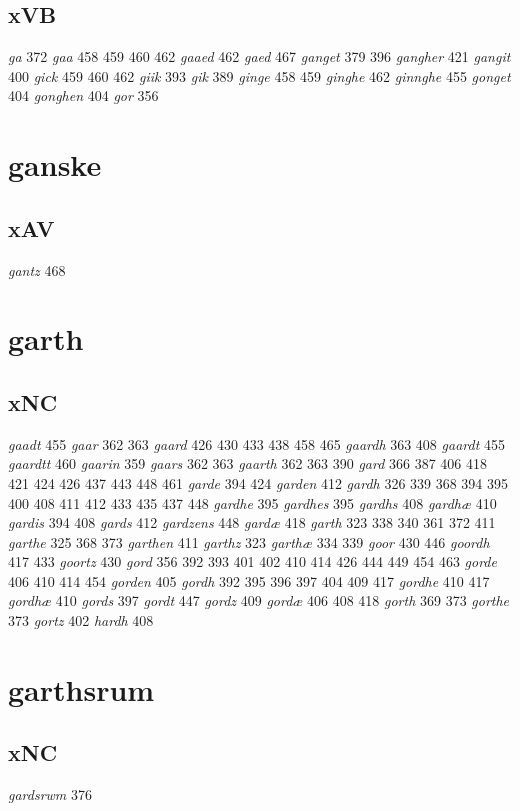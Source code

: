 \documentclass[a4paper,twocolumn]{article}
\begin{document}
\subsection{xVB}
\label{sec:orgdc026fc}
\emph{ga} 372 \emph{gaa} 458 459 460 462 \emph{gaaed} 462 \emph{gaed} 467 \emph{ganget} 379 396 \emph{gangher} 421 \emph{gangit} 400 \emph{gick} 459 460 462 \emph{giik} 393 \emph{gik} 389 \emph{ginge} 458 459 \emph{ginghe} 462 \emph{ginnghe} 455 \emph{gonget} 404 \emph{gonghen} 404 \emph{gor} 356 
\section{ganske}
\label{sec:org8220e9e}
\subsection{xAV}
\label{sec:orge936c39}
\emph{gantz} 468 
\section{garth}
\label{sec:orgb8a8e87}
\subsection{xNC}
\label{sec:org0e040cd}
\emph{gaadt} 455 \emph{gaar} 362 363 \emph{gaard} 426 430 433 438 458 465 \emph{gaardh} 363 408 \emph{gaardt} 455 \emph{gaardtt} 460 \emph{gaarin} 359 \emph{gaars} 362 363 \emph{gaarth} 362 363 390 \emph{gard} 366 387 406 418 421 424 426 437 443 448 461 \emph{garde} 394 424 \emph{garden} 412 \emph{gardh} 326 339 368 394 395 400 408 411 412 433 435 437 448 \emph{gardhe} 395 \emph{gardhes} 395 \emph{gardhs} 408 \emph{gardhæ} 410 \emph{gardis} 394 408 \emph{gards} 412 \emph{gardzens} 448 \emph{gardæ} 418 \emph{garth} 323 338 340 361 372 411 \emph{garthe} 325 368 373 \emph{garthen} 411 \emph{garthz} 323 \emph{garthæ} 334 339 \emph{goor} 430 446 \emph{goordh} 417 433 \emph{goortz} 430 \emph{gord} 356 392 393 401 402 410 414 426 444 449 454 463 \emph{gorde} 406 410 414 454 \emph{gorden} 405 \emph{gordh} 392 395 396 397 404 409 417 \emph{gordhe} 410 417 \emph{gordhæ} 410 \emph{gords} 397 \emph{gordt} 447 \emph{gordz} 409 \emph{gordæ} 406 408 418 \emph{gorth} 369 373 \emph{gorthe} 373 \emph{gortz} 402 \emph{hardh} 408 
\section{garthsrum}
\label{sec:org741408b}
\subsection{xNC}
\label{sec:orga97d8d4}
\emph{gardsrwm} 376 
\end{document}
